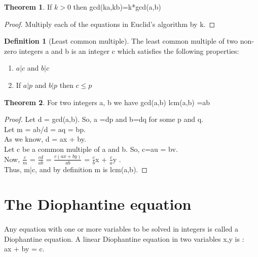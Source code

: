 \documentclass[15,a4paper]{report}
\theoremstyle{definition}
\newtheorem{definition}{Definition}[section]
\newtheorem{theorem}{Theorem}[section]
\theoremstyle{remark}
\begin{document}
\begin{theorem}
    If $k>0$ then gcd(ka,kb)=k*gcd(a,b)
\end{theorem}
\begin{proof}
    Multiply each of the equations in Euclid's algorithm by k.
\end{proof}

\begin{definition}[Least common multiple]
    The least common multiple of two non-zero integers a and b is an integer c which satisfies the following properties:\\
    \begin{enumerate}
        \item $a|c$ and $b|c$
        \item If $a|p$ and $b|p$ then $c \leq p$
    \end{enumerate}
\end{definition}

\begin{theorem}
    For two integers a, b we have gcd(a,b) lcm(a,b) =ab
\end{theorem}
\begin{proof}
    Let d = gcd(a,b). So, a =dp and b=dq for some p and q. \\ Let m = ab/d = aq = bp. \\
    As we know, d = ax + by.\\
    Let c be a common multiple of a and b. So, c=au = bv.\\
    Now, $\frac{c}{m}$ = $\frac{cd}{ab}$ = $\frac{c(ax + by)}{ab}$ = $\frac{c}{b}$x + $\frac{c}{a}$y .\\
    Thus, m|c, and by definition m is lcm(a,b).
\end{proof}

\section{The Diophantine equation}
\paragraph{} Any equation with one or more variables to be solved in integers is called a Diophantine equation. A linear Diophantine equation in two variables x,y is :\\
ax + by = c.
\end{document}
